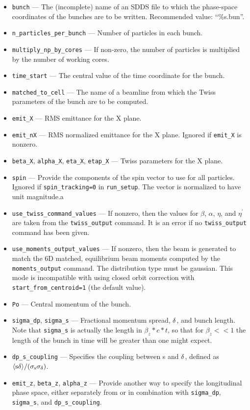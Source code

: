 \documentclass[11pt]{article}
\begin{document}
\begin{itemize}
\item \verb|bunch| --- The (incomplete) name of an SDDS file to which the phase-space coordinates
of the bunches are to be written.  Recommended value: ``\%s.bun''.  
\item \verb|n_particles_per_bunch| --- Number of particles in each bunch.
\item \verb|multiply_np_by_cores| --- If non-zero, the number of particles is multiplied by the number of
  working cores.
\item \verb|time_start| --- The central value of the time coordinate for the bunch.
\item \verb|matched_to_cell| --- The name of a beamline from which the Twiss parameters of the bunch
are to be computed.
\item \verb|emit_X| --- RMS emittance for the X plane.
\item \verb|emit_nX| --- RMS normalized emittance for the X plane.  Ignored if \verb|emit_X| is nonzero.
\item \verb|beta_X|, \verb|alpha_X|, \verb|eta_X|, \verb|etap_X| --- Twiss parameters for the X plane.
\item \verb|spin| --- Provide the components of the spin vector to use for all particles. Ignored if
  \verb|spin_tracking=0| in \verb|run_setup|. The vector is normalized to have unit magnitude.a
\item \verb|use_twiss_command_values| --- If nonzero, then the values for $\beta$, $\alpha$, 
        $\eta$, and $\eta^\prime$ are taken from the \verb|twiss_output| command.  It is an error if
        no \verb|twiss_output| command has been given.
\item \verb|use_moments_output_values| --- If nonzero, then the beam is generated to match the
  6D matched, equilibrium beam moments computed by the \verb|moments_output| command.
  The distribution type must be gaussian.
  This mode is incompatible with using closed orbit correction with \verb|start_from_centroid=1|
  (the default value).
\item \verb|Po| --- Central momentum of the bunch.
\item \verb|sigma_dp|, \verb|sigma_s| --- Fractional momentum spread, ${\rm \delta}$, and bunch length.
Note that \verb|sigma_s| is actually the length in $\beta_z*c*t$, so that for $\beta_z<<1$ the length of
the bunch in time will be greater than one might expect.
\item \verb|dp_s_coupling| ---  Specifies the coupling between s and ${\rm \delta}$, defined as 
${\rm \langle s \delta \rangle/(\sigma_s\sigma_\delta)}$.
\item \verb|emit_z|, \verb|beta_z|, \verb|alpha_z| --- Provide another way to specify the
 longitudinal phase space, either separately from or in combination with 
 \verb|sigma_dp|, \verb|sigma_s|, and \verb|dp_s_coupling|.  


\end{itemize}
\end{document}
